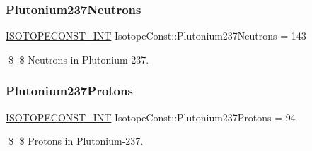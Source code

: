 \subsubsection{\texorpdfstring{Plutonium237\+Neutrons}{Plutonium237Neutrons}}
{\footnotesize\ttfamily \mbox{\hyperlink{group___isotope_const-_macros_ga5f18360b3e99483a35c32d789e62621c}{I\+S\+O\+T\+O\+P\+E\+C\+O\+N\+S\+T\+\_\+\+I\+NT}} Isotope\+Const\+::\+Plutonium237\+Neutrons = 143}

\$ \$ Neutrons in Plutonium-\/237. \mbox{\label{group___isotope_const-_plutonium-_pu237_ga2e3d3f7bd41fef1dd6ec97c8e41af977}} 
\subsubsection{\texorpdfstring{Plutonium237\+Protons}{Plutonium237Protons}}
{\footnotesize\ttfamily \mbox{\hyperlink{group___isotope_const-_macros_ga5f18360b3e99483a35c32d789e62621c}{I\+S\+O\+T\+O\+P\+E\+C\+O\+N\+S\+T\+\_\+\+I\+NT}} Isotope\+Const\+::\+Plutonium237\+Protons = 94}

\$ \$ Protons in Plutonium-\/237. 